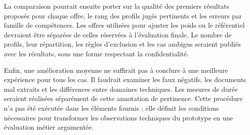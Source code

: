 La comparaison pourrait ensuite porter sur la qualité des premiers résultats proposés pour chaque offre, le rang des profils jugés pertinents et les erreurs par famille de compétences. Les offres utilisées pour ajuster les poids ou le référentiel devraient être séparées de celles réservées à l'évaluation finale. Le nombre de profils, leur répartition, les règles d'exclusion et les cas ambigus seraient publiés avec les résultats, sous une forme respectant la confidentialité.

Enfin, une amélioration moyenne ne suffirait pas à conclure à une meilleure expérience pour tous les cas. Il faudrait examiner les faux négatifs, les documents mal extraits et les différences entre domaines techniques. Les mesures de durée seraient réalisées séparément de cette annotation de pertinence. Cette procédure n'a pas été exécutée dans les éléments fournis ; elle définit les conditions nécessaires pour transformer les observations techniques du prototype en une évaluation métier argumentée.
